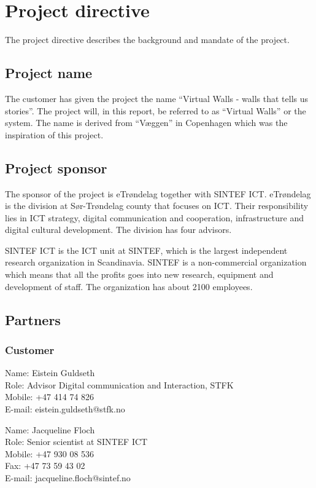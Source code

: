 \documentclass[11pt]{book}
\begin{document}
\section{Project directive}
The project directive describes the background and mandate of the project.

\subsection{Project name}
The customer has given the project the name “Virtual Walls - walls that tells us stories”. The project will, in this report, be referred to as “Virtual Walls” or the system. The name is derived from “Væggen” in Copenhagen which was the inspiration of this project.

\subsection{Project sponsor}
The sponsor of the project is eTrøndelag together with SINTEF ICT.
eTrøndelag is the division at Sør-Trøndelag county that focuses on ICT. Their responsibility lies in ICT strategy, digital communication and cooperation, infrastructure and digital cultural development. The division has four advisors.

SINTEF ICT is the ICT unit at SINTEF, which is the largest independent research organization in Scandinavia. SINTEF is a non-commercial organization which means that all the profits goes into new research, equipment and development of staff. The organization has about 2100 employees.

\subsection{Partners}
\subsubsection{Customer}
Name: Eistein Guldseth\\
Role: Advisor Digital communication and Interaction, STFK\\
Mobile: +47 414 74 826\\
E-mail: eistein.guldseth@stfk.no

Name: Jacqueline Floch\\
Role: Senior scientist at SINTEF ICT\\
Mobile: +47 930 08 536\\
Fax: +47 73 59 43 02\\
E-mail: jacqueline.floch@sintef.no
\end{document}
